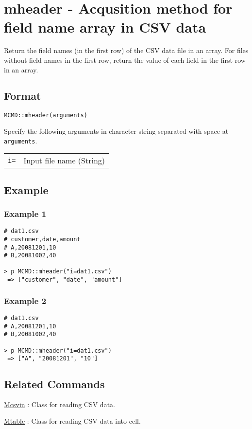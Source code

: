 
%

\section{mheader - Acqusition method for field name array in CSV data \label{sect:mheaderRB}}

Return the field names (in the first row) of the CSV data file in an array. 
For files without field names in the first row, return the value of each field in the first row in an array.
 

\subsection{Format}

{\large
\begin{verbatim}
MCMD::mheader(arguments)
\end{verbatim}
} 

Specify the following arguments in character string separated with space at \verb|arguments|.

\begin{table}[htbp]
\begin{tabular}{ll}
\verb|i=|    & Input file name (String)\\
\end{tabular} 
\end{table} 

\subsection{Example }
\subsubsection*{Example 1}

\begin{Verbatim}[baselinestretch=0.7,frame=single]
# dat1.csv
# customer,date,amount
# A,20081201,10
# B,20081002,40

> p MCMD::mheader("i=dat1.csv")
 => ["customer", "date", "amount"] 
\end{Verbatim}

\subsubsection*{Example 2}

\begin{Verbatim}[baselinestretch=0.7,frame=single]
# dat1.csv
# A,20081201,10
# B,20081002,40

> p MCMD::mheader("i=dat1.csv")
 => ["A", "20081201", "10"] 
\end{Verbatim}

\subsection{Related Commands}
\hyperref[sect:mcsvinRB]{Mcsvin} : Class for reading CSV data.

\hyperref[sect:mtableRB]{Mtable} : Class for reading CSV data into cell. 

%

